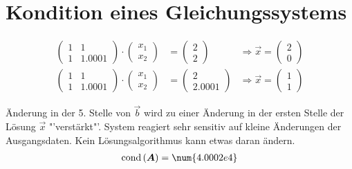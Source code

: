 \section{Kondition eines Gleichungssystems}
\begin{align}
	\begin{pmatrix}
	1 & 1\\ 1 & \num{1.0001}
	\end{pmatrix}\cdot\begin{pmatrix}
	x_1\\ x_2
	\end{pmatrix} &= \begin{pmatrix}
	2\\ 2
	\end{pmatrix}&\Rightarrow\vec{x} = \begin{pmatrix}
	2\\ 0
	\end{pmatrix}\\
	\begin{pmatrix}
	1 & 1\\ 1 & \num{1.0001}
	\end{pmatrix}\cdot\begin{pmatrix}
	x_1\\ x_2
	\end{pmatrix} &= \begin{pmatrix}
	2\\ \num{2.0001}
	\end{pmatrix}&\Rightarrow\vec{x} = \begin{pmatrix}
	1\\ 1
	\end{pmatrix}
\end{align}

Änderung in der 5. Stelle von $\vec{b}$ wird zu einer Änderung in der ersten Stelle der Lösung $\vec{x}$ "'verstärkt"'. System reagiert sehr sensitiv auf kleine Änderungen der Ausgangsdaten. Kein Lösungsalgorithmus kann etwas daran ändern.
\begin{align}
	\cond{\ma{A}} = \num{4.0002e4}
\end{align}

